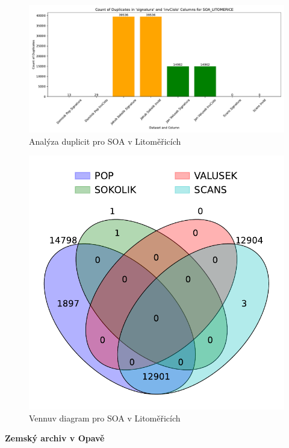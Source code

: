 \begin{figure}[htbp]
\centering
    \includegraphics[scale=.5]{obrazky-figures/dataAnalysis/soaLitomerice/duplicities.pdf}
    \caption{Analýza duplicit pro SOA v Litoměřicích}
\end{figure}

\begin{figure}[htbp]
\centering
    \includegraphics[scale=.5]{obrazky-figures/dataAnalysis/soaLitomerice/Venn_4.pdf}
    \caption{Vennuv diagram pro SOA v Litoměřicích}
\end{figure}


\newpage
\noindent\textbf{Zemský archiv v Opavě}\\

